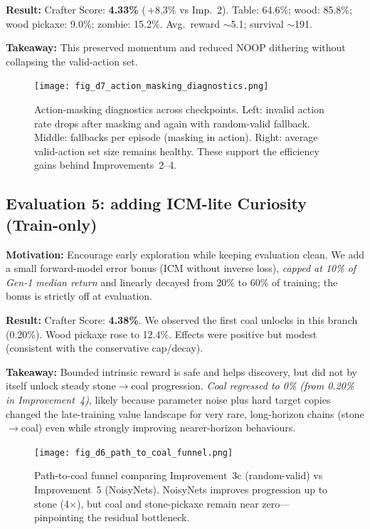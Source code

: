 \documentclass[conference]{IEEEtran}
\begin{document}
\textbf{Result:} Crafter Score: \textbf{4.33\%} (\,+8.3\% vs Imp.~2). Table: 64.6\%; wood: 85.8\%; wood pickaxe: 9.0\%; zombie: 15.2\%. Avg.\ reward $\sim$5.1; survival $\sim$191.

\textbf{Takeaway:} This preserved momentum and reduced NOOP dithering without collapsing the valid-action set.

\begin{figure}[h!]
\centering
\texttt{[image: fig\_d7\_action\_masking\_diagnostics.png]}
\caption{Action-masking diagnostics across checkpoints. Left: invalid action rate drops after masking and again with random-valid fallback. Middle: fallbacks per episode (masking in action). Right: average valid-action set size remains healthy. These support the efficiency gains behind Improvements~2–4.}
\label{fig:dqn_mask_diag}
\end{figure}


\subsection{Evaluation 5: adding ICM-lite Curiosity (Train-only)}
\textbf{Motivation:} Encourage early exploration while keeping evaluation clean. We add a small forward-model error bonus (ICM without inverse loss), \emph{capped at 10\% of Gen-1 median return} and linearly decayed from 20\% to 60\% of training; the bonus is strictly off at evaluation.

\textbf{Result:} Crafter Score: \textbf{4.38\%}. We observed the first coal unlocks in this branch (0.20\%). Wood pickaxe rose to 12.4\%. Effects were positive but modest (consistent with the conservative cap/decay).

\textbf{Takeaway:} Bounded intrinsic reward is safe and helps discovery, but did not by itself unlock steady stone$\rightarrow$coal progression. \textit{Coal regressed to 0\% (from 0.20\% in Improvement~4)}, likely because parameter noise plus hard target copies changed the late-training value landscape for very rare, long-horizon chains (stone$\rightarrow$coal) even while strongly improving nearer-horizon behaviours.

\begin{figure}[h!]
\centering
\texttt{[image: fig\_d6\_path\_to\_coal\_funnel.png]}
\caption{Path-to-coal funnel comparing Improvement~3c (random-valid) vs Improvement~5 (NoisyNets). NoisyNets improves progression up to stone (4$\times$), but coal and stone-pickaxe remain near zero—pinpointing the residual bottleneck.}
\label{fig:dqn_funnel}
\end{figure}
\end{document}
